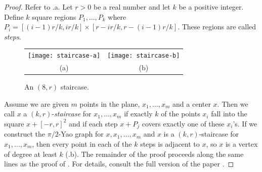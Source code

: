 \documentclass[10pt]{llncs}
\begin{document}
\begin{proof}
Refer to .a.  Let $r>0$ be a real number and let $k$ be
a positive integer.  Define $k$ square regions $P_1,\ldots,P_k$ where
$P_i = [(i-1)r/k,ir/k]\times [r-ir/k,r-(i-1)r/k]$.  These regions are
called \emph{steps}.

\begin{figure}
  \begin{center}
    \begin{tabular}{cc}
      \texttt{[image: staircase-a]} 
        & \texttt{[image: staircase-b]} \\
      (a) & (b)
    \end{tabular}
  \end{center}
  \caption{An $(8,r)$ staircase.}
\end{figure}

Assume we are given $m$ points in the plane, $x_1,\ldots,x_m$ and a center
$x$.  Then we call $x$ a $(k,r)$-\emph{staircase} for $x_1 , \ldots , x_m$
if exactly $k$ of the points $x_i$ fall into the square $x+[-r,r]^2$ and if
each step $x+P_j$ covers exactly one of these $x_i$'s.
If we construct the $\pi/2$-Yao graph for $x,x_1,\ldots,x_m$ and $x$ is a
$(k,r)$-staircase for $x_1,\ldots,x_m$, then every point in each of the $k$
steps is adjacent to $x$, so $x$ is a vertex of degree at least $k$
(.b).  The remainder of the proof proceeds along the same
lines as the proof of .  For details, consult
the full version of the paper \cite{dgm09}.


\end{proof}
\end{document}
